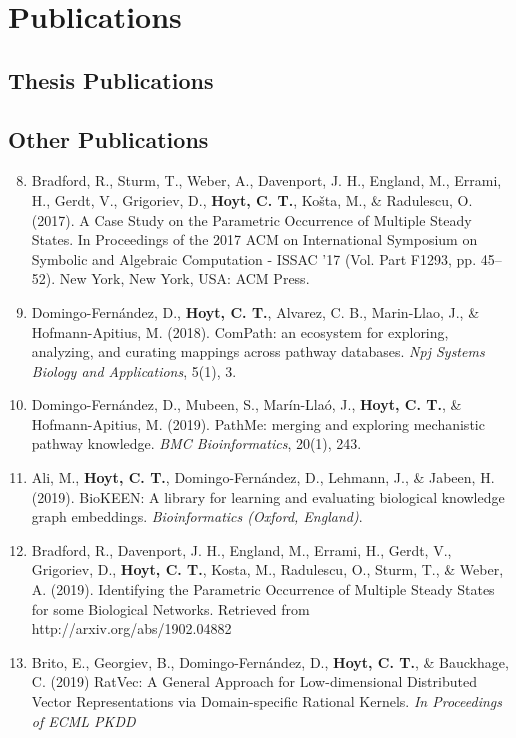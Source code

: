 \chapter*{Publications}

\section*{Thesis Publications}



\section*{Other Publications}

\begin{enumerate}
    \setcounter{enumi}{7}
    \item Bradford, R., Sturm, T., Weber, A., Davenport, J. H., England, M., Errami, H., Gerdt, V., Grigoriev, D., \textbf{Hoyt, C. T.}, Košta, M., \& Radulescu, O. (2017). A Case Study on the Parametric Occurrence of Multiple Steady States. In Proceedings of the 2017 ACM on International Symposium on Symbolic and Algebraic Computation - ISSAC ’17 (Vol. Part F1293, pp. 45–52). New York, New York, USA: ACM Press.
    \item Domingo-Fern\'{a}ndez, D., \textbf{Hoyt, C. T.}, Alvarez, C. B., Marin-Llao, J., \& Hofmann-Apitius, M. (2018). ComPath: an ecosystem for exploring, analyzing, and curating mappings across pathway databases. \textit{Npj Systems Biology and Applications}, 5(1), 3.
    \item Domingo-Fern\'{a}ndez, D., Mubeen, S., Marín-Llaó, J., \textbf{Hoyt, C. T.}, \& Hofmann-Apitius, M. (2019). PathMe: merging and exploring mechanistic pathway knowledge. \textit{BMC Bioinformatics}, 20(1), 243.
    \item Ali, M., \textbf{Hoyt, C. T.}, Domingo-Fern\'{a}ndez, D., Lehmann, J., \& Jabeen, H. (2019). BioKEEN: A library for learning and evaluating biological knowledge graph embeddings. \textit{Bioinformatics (Oxford, England)}.
    \item Bradford, R., Davenport, J. H., England, M., Errami, H., Gerdt, V., Grigoriev, D., \textbf{Hoyt, C. T.}, Kosta, M., Radulescu, O., Sturm, T., \& Weber, A. (2019). Identifying the Parametric Occurrence of Multiple Steady States for some Biological Networks. Retrieved from http://arxiv.org/abs/1902.04882
    \item Brito, E., Georgiev, B., Domingo-Fern\'{a}ndez, D., \textbf{Hoyt, C. T.}, \& Bauckhage, C. (2019) RatVec: A General Approach for Low-dimensional Distributed Vector Representations via Domain-specific Rational Kernels. \textit{In Proceedings of ECML PKDD}

\end{enumerate}
